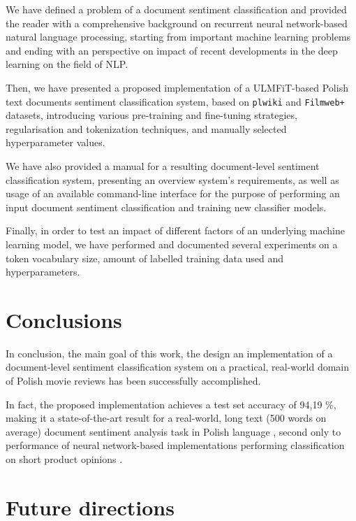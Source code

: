 We have defined a problem of a document sentiment classification and provided the reader with a comprehensive background on recurrent neural network-based natural language processing, starting from important machine learning problems and ending with an perspective on impact of recent developments in the deep learning on the field of NLP.

Then, we have presented a proposed implementation of a ULMFiT-based Polish text documents sentiment classification system, based on \lstinline{plwiki} and \lstinline{Filmweb+} datasets, introducing various pre-training and fine-tuning strategies, regularisation and tokenization techniques, and manually selected hyperparameter values.

We have also provided a manual for a resulting document-level sentiment classification system, presenting an overview system's requirements, as well as usage of an available command-line interface for the purpose of performing an input document sentiment classification and training new classifier models.

Finally, in order to test an impact of different factors of an underlying machine learning model, we have performed and documented several experiments on a token vocabulary size, amount of labelled training data used and hyperparameters.

\section{Conclusions}

In conclusion, the main goal of this work, the design an implementation of a document-level sentiment classification system on a practical, real-world domain of Polish movie reviews has been successfully accomplished.

In fact, the proposed implementation achieves a test set accuracy of 94,19 \%, making it a state-of-the-art result for a real-world, long text (500 words on average) document sentiment analysis task in Polish language \cite{poleval2019,czaplakardas:ulmfit,chlasta:sentimenttwitter}, second only to performance of neural network-based implementations performing classification on short product opinions \cite{wawer:polishsentimentshorttexts,polish:sentimentsvms}.
 
\section{Future directions}

